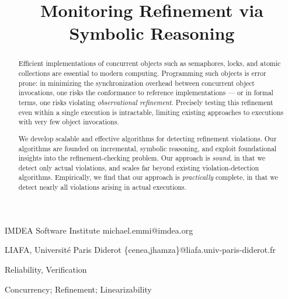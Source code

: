\documentclass{sigplanconf}
\begin{document}
  \setlength{\pdfpageheight}{\paperheight}
  \setlength{\pdfpagewidth}{\paperwidth}


  \title{Monitoring Refinement via Symbolic Reasoning}

    {IMDEA Software Institute}
    {michael.emmi@imdea.org}

    {LIAFA, Université Paris Diderot}
    {\{cenea,jhamza\}@liafa.univ-paris-diderot.fr}

  \maketitle

  \begin{abstract}

    Efficient implementations of concurrent objects such as semaphores, locks,
    and atomic collections are essential to modern computing. Programming such
    objects is error prone: in minimizing the synchronization overhead between
    concurrent object invocations, one risks the conformance to reference
    implementations --- or in formal terms, one risks violating
    \emph{observational refinement}. Precisely testing this refinement even
    within a single execution is intractable, limiting existing approaches to
    executions with very few object invocations.

    We develop scalable and effective algorithms for detecting refinement
    violations. Our algorithms are founded on incremental, symbolic reasoning,
    and exploit foundational insights into the refinement-checking problem. Our
    approach is \emph{sound}, in that we detect only actual violations, and
    scales far beyond existing violation-detection algorithms. Empirically, we
    find that our approach is \emph{practically} complete, in that we detect
    nearly all violations arising in actual executions.

  \end{abstract}
  

  \terms
  Reliability, Verification

  \keywords
  Concurrency; Refinement; Linearizability

  
  
  
  
  
  
  
  
  
  
\end{document}

